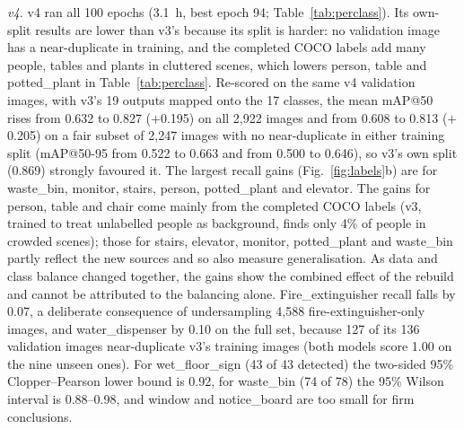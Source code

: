 \documentclass[3p,times,procedia]{elsarticle}
\DeclareRobustCommand{\rev}[1]{{\hlattr=1 #1}}
\DeclareRobustCommand{\rev}[1]{\hl{#1}}
\DeclareRobustCommand{\rev}[1]{#1}
\begin{document}
\emph{v4.} v4 ran all 100 epochs (3.1~h, best epoch 94;
Table~\ref{tab:perclass}). Its own-split results are lower than v3's because
its split is harder: no validation image has a near-duplicate in training,
and the completed COCO labels add many people, tables and plants in
cluttered scenes, which lowers person, table and potted\_plant in
Table~\ref{tab:perclass}. Re-scored on the same v4 validation images, with v3's 19
outputs mapped onto the 17 classes, the mean mAP@50 rises from 0.632 to
0.827 ($+$0.195) on all 2,922 images and \rev{from 0.608 to 0.813 ($+$0.205) on a
fair subset of 2,247 images with no near-duplicate in either training split}
(mAP@50-95 from 0.522 to 0.663 and from 0.500 to 0.646), so v3's own split
(0.869) strongly favoured it. \rev{The
largest recall gains (Fig.~\ref{fig:labels}b) are for waste\_bin, monitor,
stairs, person, potted\_plant and elevator.} The gains for person, table
and chair come mainly from the completed COCO labels (v3, trained to treat
unlabelled people as background, finds only 4\% of people in crowded
scenes); those for stairs, elevator, monitor, potted\_plant and waste\_bin
partly reflect the new sources and so also measure generalisation. As data
and class balance changed together, \rev{the gains show the combined effect of
the rebuild and cannot be attributed to the balancing alone.}
\rev{Fire\_extinguisher recall falls by 0.07, a deliberate consequence of
undersampling 4,588 fire-extinguisher-only images}, and
water\_dispenser by 0.10 on the full set, because 127 of its 136 validation
images near-duplicate v3's training images (both models score 1.00 on the
nine unseen ones). \rev{For wet\_floor\_sign (43 of 43 detected) the two-sided
95\% Clopper--Pearson lower bound is 0.92, for waste\_bin (74 of 78) the
95\% Wilson interval is 0.88--0.98}, and window and notice\_board are too
small for firm conclusions.
\end{document}
